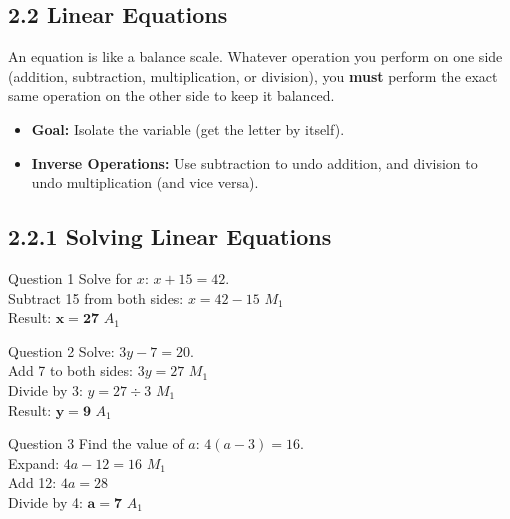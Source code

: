 \documentclass[12pt, a4paper, oneside]{article}
\begin{document}
\subsection*{2.2 Linear Equations}

\begin{tcolorbox}[colback=lightgrey, colframe=primaryblue, title=\textbf{The Golden Rule of Equations}, arc=5pt]
    An equation is like a balance scale. Whatever operation you perform on one side (addition, subtraction, multiplication, or division), you \textbf{must} perform the exact same operation on the other side to keep it balanced.
    \begin{itemize}
        \item \textbf{Goal:} Isolate the variable (get the letter by itself).
        \item \textbf{Inverse Operations:} Use subtraction to undo addition, and division to undo multiplication (and vice versa).
    \end{itemize}
\end{tcolorbox}

\subsection*{2.2.1 Solving Linear Equations}

\begin{solvingbox}{Question 1}
Solve for $x$: $x + 15 = 42$. \\
Subtract 15 from both sides: $x = 42 - 15$ \hfill $M_1$ \\
Result: $\mathbf{x = 27}$ \hfill $A_1$
\end{solvingbox}

\begin{solvingbox}{Question 2}
Solve: $3y - 7 = 20$. \\
Add 7 to both sides: $3y = 27$ \hfill $M_1$ \\
Divide by 3: $y = 27 \div 3$ \hfill $M_1$ \\
Result: $\mathbf{y = 9}$ \hfill $A_1$
\end{solvingbox}

\begin{solvingbox}{Question 3}
Find the value of $a$: $4(a - 3) = 16$. \\
Expand: $4a - 12 = 16$ \hfill $M_1$ \\
Add 12: $4a = 28$ \\
Divide by 4: $\mathbf{a = 7}$ \hfill $A_1$
\end{solvingbox}
\end{document}
